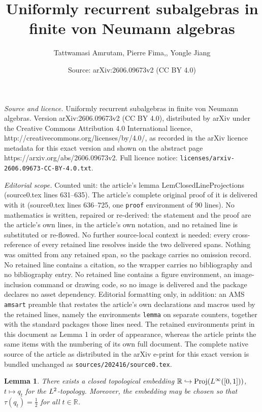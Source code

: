 \documentclass[10pt,a4paper]{amsart}
\title{Uniformly recurrent subalgebras in finite von Neumann algebras}
\author{Tattwamasi Amrutam, Pierre Fima,, Yongle Jiang}
\date{Source: arXiv:2606.09673v2 (CC BY 4.0)}
\newtheorem{lemma}{Lemma}
\DeclareMathOperator{\Proj}{Proj}
\newcommand{\R}{\mathbb{R}}
\begin{document}
\maketitle

\noindent\emph{Source and licence.} Uniformly recurrent subalgebras in finite von Neumann algebras. Version arXiv:2606.09673v2 (CC BY 4.0), distributed by arXiv under the Creative Commons Attribution 4.0 International licence, http://creativecommons.org/licenses/by/4.0/, as recorded in the arXiv licence metadata for this exact version and shown on the abstract page https://arxiv.org/abs/2606.09673v2. Full licence notice: \texttt{licenses/arxiv-2606.09673-CC-BY-4.0.txt}.\par\smallskip

\noindent\textit{Editorial scope.} Counted unit: the article's lemma LemClosedLineProjections (source0.tex lines 631--635). The article's complete original proof of it is delivered with it (source0.tex lines 636--725, one \texttt{proof} environment of 90 lines). No mathematics is written, repaired or re-derived: the statement and the proof are the article's own lines, in the article's own notation, and no retained line is substituted or re-flowed.  No further source-local context is needed: every cross-reference of every retained line resolves inside the two delivered spans.  Nothing was omitted from any retained span, so the package carries no omission record.  No retained line contains a citation, so the wrapper carries no bibliography and no bibliography entry.  No retained line contains a figure environment, an image-inclusion command or drawing code, so no image is delivered and the package declares no asset dependency.  Editorial formatting only, in addition: an AMS \texttt{amsart} preamble that restates the article's own declarations and macros used by the retained lines, namely the environments \texttt{lemma} on separate counters, together with the standard packages those lines need.  The retained environments print in this document as Lemma 1 in order of appearance, whereas the article prints the same items with the numbering of its own full document.  The complete native source of the article as distributed in the arXiv e-print for this exact version is bundled unchanged as \texttt{sources/202416/source0.tex}.
\begin{lemma}
\label{LemClosedLineProjections}
There exists a closed topological embedding $\mathbb R\hookrightarrow \Proj({\rm L}^\infty([0,1]))$, $t\mapsto q_t$
for the \({\rm L}^2\)-topology. Moreover, the embedding may be chosen so that $\tau(q_t)=\frac12$ for all $t\in\R$.
\end{lemma}
\end{document}
